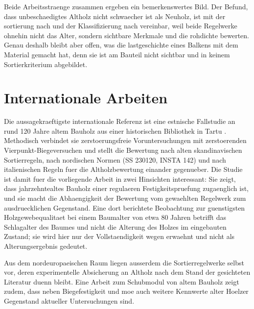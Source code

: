 Beide Arbeitsstraenge zusammen ergeben ein bemerkenswertes Bild. Der Befund,
dass unbeschaedigtes Altholz nicht schwaecher ist als Neuholz, ist mit der
\gls{sortierung} nach \textcite{din4074} und der Klassifizierung nach
\textcite{en338} vereinbar, weil beide Regelwerke ohnehin nicht das Alter,
sondern sichtbare Merkmale und die \gls{rohdichte} bewerten. Genau deshalb
bleibt aber offen, was die \gls{lastgeschichte} eines Balkens mit dem Material
gemacht hat, denn sie ist am Bauteil nicht sichtbar und in keinem
Sortierkriterium abgebildet.

\section{Internationale Arbeiten}
\label{sec:lit-international}

Die aussagekraeftigste internationale Referenz ist eine estnische Fallstudie an
rund 120 Jahre altem Bauholz aus einer historischen Bibliothek in Tartu
\parencite{tartu}. Methodisch verbindet sie zerstoerungsfreie Voruntersuchungen
mit zerstoerenden Vierpunkt-Biegeversuchen und stellt die Bewertung nach alten
skandinavischen Sortierregeln, nach nordischen Normen (SS 230120, INSTA 142)
und nach italienischen Regeln fuer die Altholzbewertung einander gegenueber.
Die Studie ist damit fuer die vorliegende Arbeit in zwei Hinsichten
interessant: Sie zeigt, dass jahrzehntealtes Bauholz einer regulaeren
Festigkeitspruefung zugaenglich ist, und sie macht die Abhaengigkeit der
Bewertung vom gewaehlten Regelwerk zum ausdruecklichen Gegenstand. Eine dort
berichtete Beobachtung zur guenstigsten Holzgewebequalitaet bei einem Baumalter
von etwa 80 Jahren betrifft das Schlagalter des Baumes und nicht die Alterung
des Holzes im eingebauten Zustand; sie wird hier nur der Vollstaendigkeit wegen
erwaehnt und nicht als Alterungsergebnis gedeutet.

Aus dem nordeuropaeischen Raum liegen ausserdem die Sortierregelwerke selbst
vor, deren experimentelle Absicherung an Altholz nach dem Stand der gesichteten
Literatur duenn bleibt. Eine Arbeit zum Schubmodul von altem Bauholz
\parencite{iforest} zeigt zudem, dass neben Biegefestigkeit und
\acrshort{moe} auch weitere Kennwerte alter Hoelzer Gegenstand aktueller
Untersuchungen sind.

